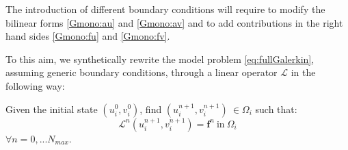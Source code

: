 \documentclass[a4paper]{siamonline220329}
\begin{document}
The introduction of different boundary conditions will require to modify the bilinear forms \eqref{Gmono:au} and \eqref{Gmono:av} and to add contributions in the right hand sides \eqref{Gmono:fu} and \eqref{Gmono:fv}.

To this aim, we synthetically rewrite the model problem \eqref{eq:fullGalerkin}, assuming generic boundary conditions, through a linear operator $\mathcal{L}$ in the following way:

Given the initial state $(u_i^0, v_i^0)$, find $(u_i^{n+1}, v_i^{n+1}) \ \in \Omega_i$ such that:
\begin{equation}\label{eq:modelpb}
\mathcal{L}^n (u_i^{n+1}, v_i^{n+1}) = \mathbf{f}^n \ \text{in} \ \Omega_i
\end{equation}
$\forall n = 0, ... N_{max}$.
\end{document}
